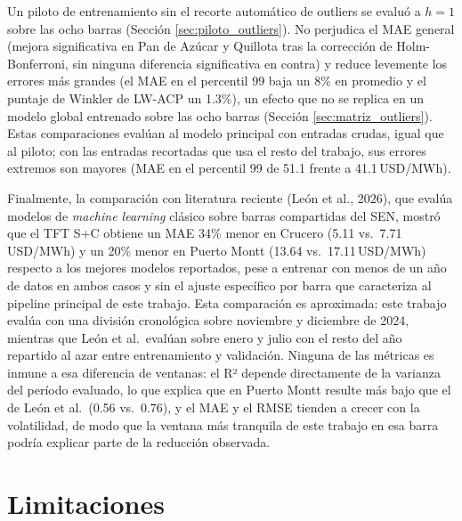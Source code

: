 Un piloto de entrenamiento sin el recorte automático de outliers se evaluó a $h=1$ sobre las ocho barras (Sección \ref{sec:piloto_outliers}). No perjudica el MAE general (mejora significativa en Pan de Azúcar y Quillota tras la corrección de Holm-Bonferroni, sin ninguna diferencia significativa en contra) y reduce levemente los errores más grandes (el MAE en el percentil 99 baja un 8\% en promedio y el puntaje de Winkler de LW-ACP un 1.3\%), un efecto que no se replica en un modelo global entrenado sobre las ocho barras (Sección \ref{sec:matriz_outliers}). Estas comparaciones evalúan al modelo principal con entradas crudas, igual que al piloto; con las entradas recortadas que usa el resto del trabajo, sus errores extremos son mayores (MAE en el percentil 99 de 51.1 frente a 41.1\,USD/MWh).

Finalmente, la comparación con literatura reciente (León et al., 2026), que evalúa modelos de \textit{machine learning} clásico sobre barras compartidas del SEN, mostró que el TFT S+C obtiene un MAE 34\% menor en Crucero (5.11 vs.\ 7.71\,USD/MWh) y un 20\% menor en Puerto Montt (13.64 vs.\ 17.11\,USD/MWh) respecto a los mejores modelos reportados, pese a entrenar con menos de un año de datos en ambos casos y sin el ajuste específico por barra que caracteriza al pipeline principal de este trabajo. Esta comparación es aproximada: este trabajo evalúa con una división cronológica sobre noviembre y diciembre de 2024, mientras que León et al.\ evalúan sobre enero y julio con el resto del año repartido al azar entre entrenamiento y validación. Ninguna de las métricas es inmune a esa diferencia de ventanas: el R² depende directamente de la varianza del período evaluado, lo que explica que en Puerto Montt resulte más bajo que el de León et al.\ (0.56 vs.\ 0.76), y el MAE y el RMSE tienden a crecer con la volatilidad, de modo que la ventana más tranquila de este trabajo en esa barra podría explicar parte de la reducción observada.

\section{Limitaciones}

